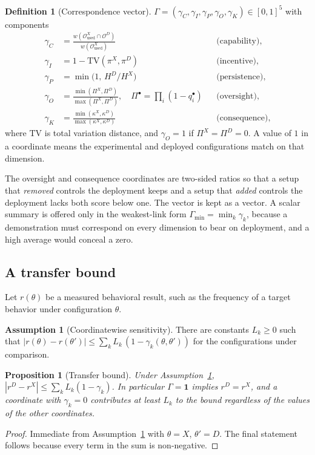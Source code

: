 \documentclass[11pt]{article}
\newtheorem{proposition}[theorem]{Proposition}
\theoremstyle{definition}
\newtheorem{definition}[theorem]{Definition}
\newtheorem{assumption}[theorem]{Assumption}
\begin{document}
\begin{definition}[Correspondence vector]
$\Gamma=(\gamma_C,\gamma_I,\gamma_P,\gamma_O,\gamma_K)\in[0,1]^5$ with components
\begin{align*}
\gamma_C&=\frac{w(\mathcal{O}^X_{\mathrm{used}}\cap\mathcal{O}^D)}{w(\mathcal{O}^X_{\mathrm{used}})} &&\text{(capability)},\\
\gamma_I&=1-\mathrm{TV}(\pi^X,\pi^D) &&\text{(incentive)},\\
\gamma_P&=\min\!\bigl(1,\,H^D/H^X\bigr) &&\text{(persistence)},\\
\gamma_O&=\frac{\min(\Pi^X,\Pi^D)}{\max(\Pi^X,\Pi^D)},\quad \Pi^\bullet=\prod_i(1-q^\bullet_i) &&\text{(oversight)},\\
\gamma_K&=\frac{\min(\kappa^X,\kappa^D)}{\max(\kappa^X,\kappa^D)} &&\text{(consequence)},
\end{align*}
where $\mathrm{TV}$ is total variation distance, and $\gamma_O=1$ if $\Pi^X=\Pi^D=0$. A value of $1$ in a coordinate means the experimental and deployed configurations match on that dimension.
\end{definition}

The oversight and consequence coordinates are two-sided ratios so that a setup that \emph{removed} controls the deployment keeps and a setup that \emph{added} controls the deployment lacks both score below one. The vector is kept as a vector. A scalar summary is offered only in the weakest-link form $\Gamma_{\min}=\min_k\gamma_k$, because a demonstration must correspond on every dimension to bear on deployment, and a high average would conceal a zero.

\subsection{A transfer bound}

Let $r(\theta)$ be a measured behavioral result, such as the frequency of a target behavior under configuration $\theta$.

\begin{assumption}[Coordinatewise sensitivity]\label{ass:C1}
There are constants $L_k\ge0$ such that $|r(\theta)-r(\theta')|\le\sum_{k}L_k\,(1-\gamma_k(\theta,\theta'))$ for the configurations under comparison.
\end{assumption}

\begin{proposition}[Transfer bound]\label{prop:C1}
Under Assumption~\ref{ass:C1}, $|r^D-r^X|\le\sum_kL_k(1-\gamma_k)$. In particular $\Gamma=\mathbf{1}$ implies $r^D=r^X$, and a coordinate with $\gamma_k=0$ contributes at least $L_k$ to the bound regardless of the values of the other coordinates.
\end{proposition}
\begin{proof}
Immediate from Assumption~\ref{ass:C1} with $\theta=X$, $\theta'=D$. The final statement follows because every term in the sum is non-negative.
\end{proof}
\end{document}
